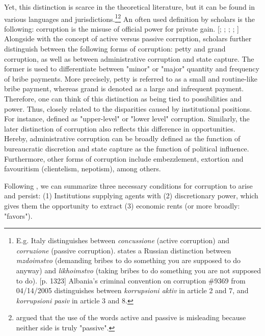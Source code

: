 Yet, this distinction is scarce in the theoretical literature, but it can be found in various languages and jurisdictions.\footnote{E.g. Italy distinguishes between {\it concussione} (active corruption) and {\it corruzione} (passive corruption). \citet{bardhan1997corruption} states a Russian distinction between {\it mzdoimstvo} (demanding bribes to do something you are supposed to do anyway) and {\it likhoimstvo} (taking bribes to do something you are not supposed to do). [p. 1323] Albania's criminal convention on corruption \#9369 from 04/14/2005 distinguishes between {\it korrupsioni aktiv} in article 2 and 7, and {\it korrupsioni pasiv} in article 3 and 8.}\footnote{\citet[p. 222]{rose2010law} argued that the use of the words active and passive is misleading because neither side is truly "passive".} \citep[p. 104]{capasso2018active} An often used definition by scholars is the following: corruption is the misuse of official power for private gain. [\citealp[p. F632]{aidt2003}; \citealp[p. 1321]{bardhan1997corruption}; \citealp[p. 422]{kaufmann1997privatization}; \citealp[p. 20]{svensson2005eight}; \citealp[p. 59]{huntington1968political}]
Alongside with the concept of active versus passive corruption, scholars further distinguish between the following forms of corruption: petty and grand corruption, as well as between administrative corruption and state capture. The former is used to differentiate between "minor" or "major" quantity and frequency of bribe payments. More precisely, petty is referred to as a small and routine-like bribe payment, whereas grand is denoted as a large and infrequent payment. Therefore, one can think of this distinction as being tied to possibilities and power. Thus, closely related to the disparities caused by institutional positions. For instance, defined as "upper-level" or "lower level" corruption. \citep[pp. 10--11]{morris2011forms} Similarly, the later distinction of corruption also reflects this difference in opportunities. 
Hereby, administrative corruption can be broadly defined as the function of bureaucratic discretion and state capture as the function of political influence. \citep[pp. 10--11]{gray2004anticorruption} Furthermore, other forms of corruption include embezzlement, extortion and favouritism (clientelism, nepotism), among others. \citep[p. 10]{morris2011forms}

Following \citet[p. F633]{aidt2003}, we can summarize three necessary conditions for corruption to arise and persist: (1) Institutions supplying agents with (2) discretionary power, which gives them the opportunity to extract (3) economic rents (or more broadly: "favors"). 

